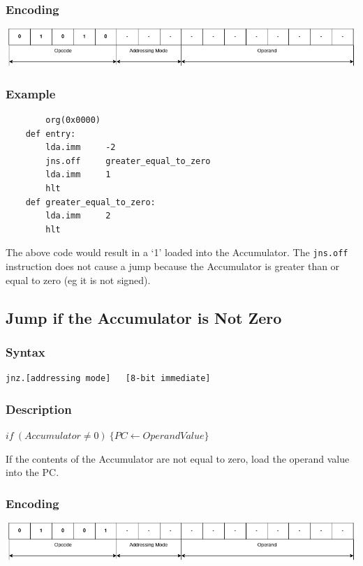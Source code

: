    \subsubsection{Encoding}
    \begin{center}
        \includegraphics[scale=0.40]{img/Andromeda-JNS.drawio}
    \end{center}

    \subsubsection{Example}
    \begin{verbatim}
        org(0x0000)
    def entry:
        lda.imm     -2
        jns.off     greater_equal_to_zero
        lda.imm     1
        hlt
    def greater_equal_to_zero:
        lda.imm     2
        hlt
    \end{verbatim}
    \par The above code would result in a `1' loaded into the Accumulator.
    The \texttt{jns.off} instruction does not cause a jump because the Accumulator
    is greater than or equal to zero (eg it is not signed).

\pagebreak
\subsection{Jump if the Accumulator is Not Zero}\label{subsec:jnz}
    \subsubsection{Syntax}
    \begin{verbatim}jnz.[addressing mode]   [8-bit immediate]\end{verbatim}
    \subsubsection{Description}
    $if\ (Accumulator \neq 0)\ \{ PC \leftarrow OperandValue \}$
    \par If the contents of the Accumulator are not equal to zero, load the operand value into the PC\@.
    \subsubsection{Encoding}
    \begin{center}
        \includegraphics[scale=0.40]{img/Andromeda-JNZ.drawio}
    \end{center}

